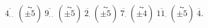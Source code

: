 \documentclass[preview]{standalone}
\begin{document}
\begin{center}
$\overline{4_{\cdot\cdot}} \ (\stackrel{\leftrightharpoon}{\pm5}) \ \overline{9_{\cdot\cdot}} \ (\stackrel{\leftrightharpoon}{\pm5}) \ \overline{2_\cdot} \ (\stackrel{\leftrightharpoon}{\pm5}) \ \overline{7_\cdot} \ (\stackrel{\leftrightharpoon}{\pm4}) \ \overline{11_\cdot} \ (\stackrel{\leftrightharpoon}{\pm5}) \ \overline{4}$.
\end{center}
\end{document}
